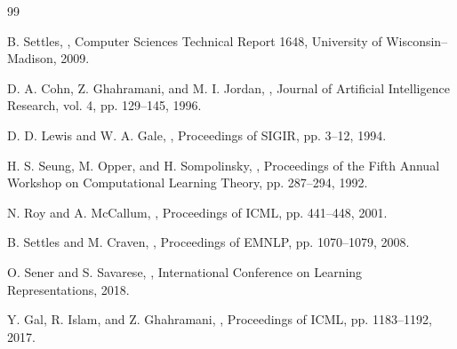 \documentclass[12pt,a4paper,oneside]{report}
\begin{document}
\begin{thebibliography}{99}

B. Settles,
\newblock {},
\newblock Computer Sciences Technical Report 1648, University of Wisconsin--Madison, 2009.

D. A. Cohn, Z. Ghahramani, and M. I. Jordan,
\newblock {},
\newblock Journal of Artificial Intelligence Research, vol. 4, pp. 129--145, 1996.

D. D. Lewis and W. A. Gale,
\newblock {},
\newblock Proceedings of SIGIR, pp. 3--12, 1994.

H. S. Seung, M. Opper, and H. Sompolinsky,
\newblock {},
\newblock Proceedings of the Fifth Annual Workshop on Computational Learning Theory, pp. 287--294, 1992.

N. Roy and A. McCallum,
\newblock {},
\newblock Proceedings of ICML, pp. 441--448, 2001.

B. Settles and M. Craven,
\newblock {},
\newblock Proceedings of EMNLP, pp. 1070--1079, 2008.

O. Sener and S. Savarese,
\newblock {},
\newblock International Conference on Learning Representations, 2018.

Y. Gal, R. Islam, and Z. Ghahramani,
\newblock {},
\newblock Proceedings of ICML, pp. 1183--1192, 2017.

\end{thebibliography}
\end{document}
